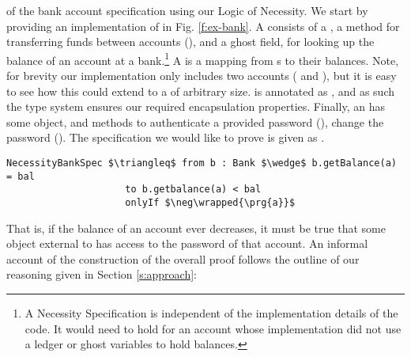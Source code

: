 of the bank account specification using our Logic of Necessity.
We start by providing an implementation of  in Fig. \ref{f:ex-bank}.
A  consists of a , a method for transferring 
funds between accounts (), and a ghost field, 
for looking up the balance of an account at a bank.\footnote{A Necessity Specification is independent of the implementation details of the code. It would need to hold for an account whose implementation did not use a ledger or ghost variables to hold balances.}
A  is
a mapping from s to their balances. Note, for brevity
our implementation only includes two accounts ( and ),
but it is easy to see how this could extend to a 
of arbitrary size.  is annotated as \enclosed, and as 
such the type system ensures our required encapsulation properties.
Finally, an  has some  object, and 
methods to authenticate a provided password (), 
change the password ().
The specification we would like to prove is given as .
\begin{lstlisting}[language = Chainmail, mathescape=true, frame=lines]
NecessityBankSpec $\triangleq$ from b : Bank $\wedge$ b.getBalance(a) = bal 
                     to b.getbalance(a) < bal
                     onlyIf $\neg\wrapped{\prg{a}}$
\end{lstlisting}
That is, if the balance of an account ever decreases, it must be true that some object external to
 has access to the password of that account. An informal account of the construction of 
the overall proof follows the outline of our reasoning given in Section \ref{s:approach}:
